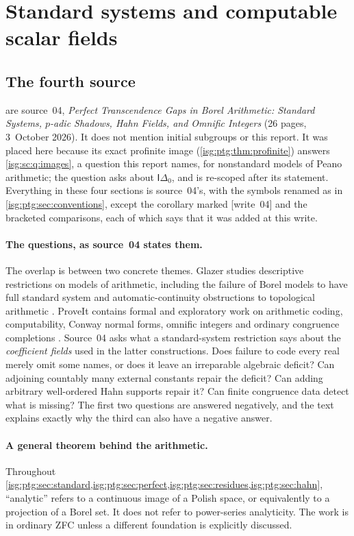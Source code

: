 \documentclass[11pt]{article}
\theoremstyle{definition}
\theoremstyle{remark}
\newcommand{\Idelta}{\mathsf{I}\Delta_0}
\begin{document}
\section{Standard systems and computable scalar fields}\label{isg:ptg:sec:standard}

\subsection{The fourth source}\label{isg:ptg:sec:overview}
are source~04, \emph{Perfect Transcendence Gaps in Borel Arithmetic:
Standard Systems, $p$-adic Shadows, Hahn Fields, and Omnific Integers}
(26 pages, 3~October 2026). It does not mention initial subgroups or this
report. It was placed here because its exact profinite image
(\cref{isg:ptg:thm:profinite}) answers \cref{isg:sc:q:images}, a question
this report names, for nonstandard models of Peano arithmetic; the
question asks about $\Idelta$, and is re-scoped after its statement.
Everything in these four sections is source~04's, with the symbols renamed
as in \cref{isg:ptg:sec:conventions}, except the corollary marked
\textup{[write~04]} and the bracketed comparisons, each of which says that
it was added at this write.

\paragraph{The questions, as source~04 states them.} The overlap is between
two concrete themes. Glazer studies descriptive restrictions on models of
arithmetic, including the failure of Borel models to have full standard
system and automatic-continuity obstructions to topological arithmetic
\cite{GlazerSS,Glazer}. ProveIt contains formal and exploratory work on
arithmetic coding, computability, Conway normal forms, omnific integers and
ordinary congruence completions \cite{ProveItPTG}. Source~04 asks what a
standard-system restriction says about the \emph{coefficient fields} used
in the latter constructions. Does failure to code every real merely omit
some names, or does it leave an irreparable algebraic deficit? Can
adjoining countably many external constants repair the deficit? Can
adding arbitrary well-ordered Hahn supports repair it? Can finite
congruence data detect what is missing? The first two questions are
answered negatively, and the text explains exactly why the third can also
have a negative answer.

\paragraph{A general theorem behind the arithmetic.} Throughout
\cref{isg:ptg:sec:standard,isg:ptg:sec:perfect,isg:ptg:sec:residues,isg:ptg:sec:hahn},
``analytic'' refers to a continuous image of a Polish space, or
equivalently to a projection of a Borel set. It does not refer to
power-series analyticity. The work is in ordinary ZFC unless a different
foundation is explicitly discussed.
\end{document}
